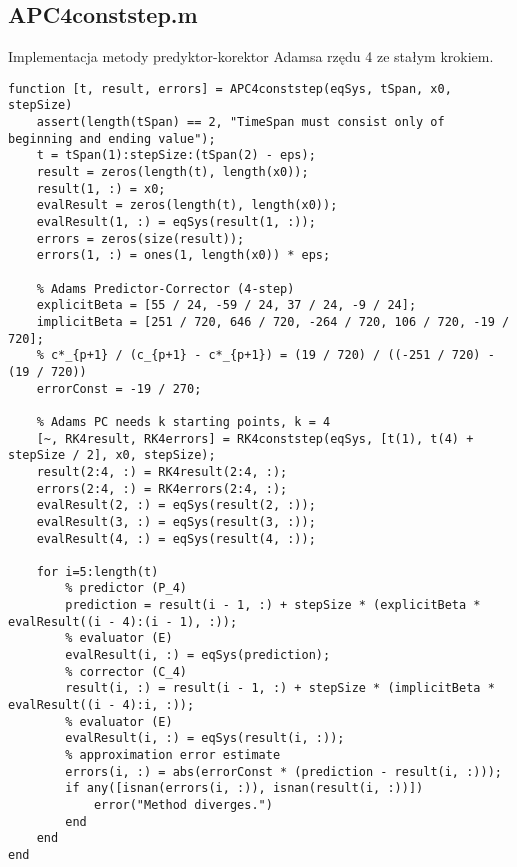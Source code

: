 \documentclass[12pt]{article}
\begin{document}
\subsection{APC4conststep.m}
Implementacja metody predyktor-korektor Adamsa rzędu 4 ze stałym krokiem.
\begin{verbatim}
function [t, result, errors] = APC4conststep(eqSys, tSpan, x0, stepSize)
    assert(length(tSpan) == 2, "TimeSpan must consist only of beginning and ending value");
    t = tSpan(1):stepSize:(tSpan(2) - eps);
    result = zeros(length(t), length(x0));
    result(1, :) = x0;
    evalResult = zeros(length(t), length(x0));
    evalResult(1, :) = eqSys(result(1, :));
    errors = zeros(size(result));
    errors(1, :) = ones(1, length(x0)) * eps;

    % Adams Predictor-Corrector (4-step)
    explicitBeta = [55 / 24, -59 / 24, 37 / 24, -9 / 24];
    implicitBeta = [251 / 720, 646 / 720, -264 / 720, 106 / 720, -19 / 720];
    % c*_{p+1} / (c_{p+1} - c*_{p+1}) = (19 / 720) / ((-251 / 720) - (19 / 720))
    errorConst = -19 / 270;

    % Adams PC needs k starting points, k = 4
    [~, RK4result, RK4errors] = RK4conststep(eqSys, [t(1), t(4) + stepSize / 2], x0, stepSize);
    result(2:4, :) = RK4result(2:4, :);
    errors(2:4, :) = RK4errors(2:4, :);
    evalResult(2, :) = eqSys(result(2, :));
    evalResult(3, :) = eqSys(result(3, :));
    evalResult(4, :) = eqSys(result(4, :));

    for i=5:length(t)
        % predictor (P_4)
        prediction = result(i - 1, :) + stepSize * (explicitBeta * evalResult((i - 4):(i - 1), :));
        % evaluator (E)
        evalResult(i, :) = eqSys(prediction);
        % corrector (C_4)
        result(i, :) = result(i - 1, :) + stepSize * (implicitBeta * evalResult((i - 4):i, :));
        % evaluator (E)
        evalResult(i, :) = eqSys(result(i, :));
        % approximation error estimate
        errors(i, :) = abs(errorConst * (prediction - result(i, :)));
        if any([isnan(errors(i, :)), isnan(result(i, :))])
            error("Method diverges.")
        end
    end
end
\end{verbatim}
\end{document}
